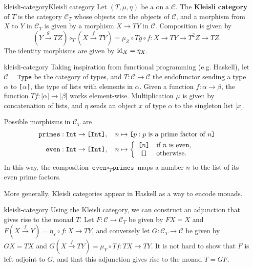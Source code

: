 \begin{topic}{kleisli-category}{Kleisli category}
    Let $(T, \mu, \eta)$ be a  on a  $\mathcal{C}$. The \textbf{Kleisli category} of $T$ is the category $\mathcal{C}_T$ whose objects are the objects of $\mathcal{C}$, and a morphism from $X$ to $Y$ in $\mathcal{C}_T$ is given by a morphism $X \to TY$ in $\mathcal{C}$. Composition is given by
    \[ (Y \xrightarrow{g} TZ) \circ_T (X \xrightarrow{f} TY) = \mu_Z \circ Tg \circ f \colon X \to TY \to T^2 Z \to TZ . \]
    The identity morphisms are given by $\textup{id}_X = \eta_X$.
\end{topic}

\begin{example}{kleisli-category}
    Taking inspiration from functional programming (e.g. Haskell), let $\mathcal{C} = \texttt{Type}$ be the category of types, and $T \colon \mathcal{C} \to \mathcal{C}$ the endofunctor sending a type $\alpha$ to \texttt{[$\alpha$]}, the type of lists with elements in $\alpha$. Given a function $f \colon \alpha \to \beta$, the function $Tf \colon \texttt{[}\alpha\texttt{]} \to \texttt{[}\beta\texttt{]}$ works element-wise.
    Multiplication $\mu$ is given by concatenation of lists, and $\eta$ sends an object $x$ of type $\alpha$ to the singleton list $\texttt{[}x\texttt{]}$.
    
    Possible morphisms in $\mathcal{C}_T$ are
    \[ \begin{aligned}
        \texttt{primes} &: \texttt{Int} \to \texttt{[Int]}, \quad n \mapsto \texttt{[}p : p \textup{ is a prime factor of } n\texttt{]} \\
        \texttt{even} &: \texttt{Int} \to \texttt{[Int]}, \quad n \mapsto \left\{ \begin{array}{cl}
         \texttt{[$n$]} & \text{if $n$ is even,} \\
         \texttt{[]} & \text{otherwise.} \end{array} \right.
    \end{aligned} \]
    In this way, the composition $\texttt{even} \circ_T \texttt{primes}$ maps a number $n$ to the list of its even prime factors.
    
    More generally, Kleisli categories appear in Haskell as a way to encode monads.
\end{example}

\begin{example}{kleisli-category}
    Using the Kleisli category, we can construct an adjunction that gives rise to the monad $T$. Let $F \colon \mathcal{C} \to \mathcal{C}_T$ be given by $FX = X$ and $F(X \xrightarrow{f} Y) = \eta_Y \circ f \colon X \to TY$, and conversely let $G \colon \mathcal{C}_T \to \mathcal{C}$ be given by $GX = TX$ and $G(X \xrightarrow{f} TY) = \mu_Y \circ Tf \colon TX \to TY$. It is not hard to show that $F$ is left adjoint to $G$, and that this adjunction gives rise to the monad $T = GF$.
\end{example}

